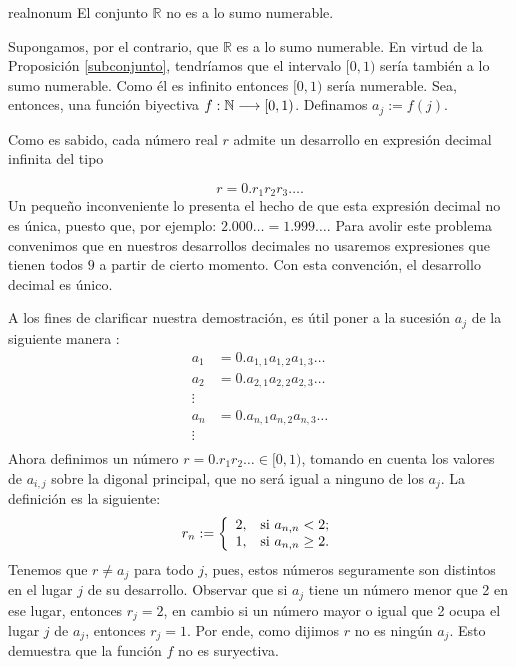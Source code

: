 \begin{teorema}{realnonum} El conjunto $\mathbb{R}$ no es
a lo sumo numerable.
\end{teorema}
\begin{demo} Supongamos, por el contrario, que $\mathbb{R}$ es a
lo sumo numerable. En virtud de la Proposición
\vref{subconjunto}, tendríamos que el intervalo $[0,1)$
sería también a lo sumo numerable. Como él es infinito
entonces $[0,1)$ sería numerable. Sea, entonces, una
función biyectiva $f:\mathbb{N}\longrightarrow [0,1)$. Definamos
$a_j:=f(j)$.

Como es sabido, cada número real $r$ admite un desarrollo en
expresión decimal infinita del tipo

\[r=0.r_1r_2r_3\dots.\]
Un peque\~no inconveniente lo presenta el hecho de que esta
expresión decimal no es única, puesto que, por ejemplo:
$2.000\dots=1.999\dots$. Para avolir este problema convenimos que
en nuestros desarrollos decimales no usaremos expresiones que
tienen todos $9$ a partir de cierto momento. Con esta
convención, el desarrollo decimal es único.

A los fines de clarificar nuestra demostración, es útil poner
a la sucesión $a_j$ de la siguiente manera :
\[\begin{split}
a_1&=0.a_{1,1}a_{1,2}a_{1,3}\dots\\
a_2&=0.a_{2,1}a_{2,2}a_{2,3}\dots\\
\vdots&\\
a_n&=0.a_{n,1}a_{n,2}a_{n,3}\dots\\
 \vdots&\\
 \end{split}\]
Ahora definimos un número $r=0.r_1r_2\dots\in[0,1)$, tomando en
cuenta los valores de $a_{i,j}$ sobre la digonal principal, que
    no será igual a ninguno de los $a_j$. La definición es la
siguiente:
\[r_n:=\left\{
\begin{array}{ll}
    2, & \hbox{si $a_{n,n}<2$;} \\
    1, & \hbox{si $a_{n,n}\geq 2$.} \\
\end{array}
\right.
\]
Tenemos que $r\neq a_j$ para todo $j$, pues, estos números
seguramente son distintos en el lugar $j$ de su desarrollo.
Observar que si $a_j$ tiene un número menor que 2 en ese lugar,
entonces $r_j=2$, en cambio si un número mayor o igual que 2
ocupa el lugar $j$ de $a_j$, entonces $r_j=1$. Por ende, como
dijimos $r$ no es ningún $a_j$. Esto demuestra que la función
$f$ no es suryectiva.
\end{demo}

